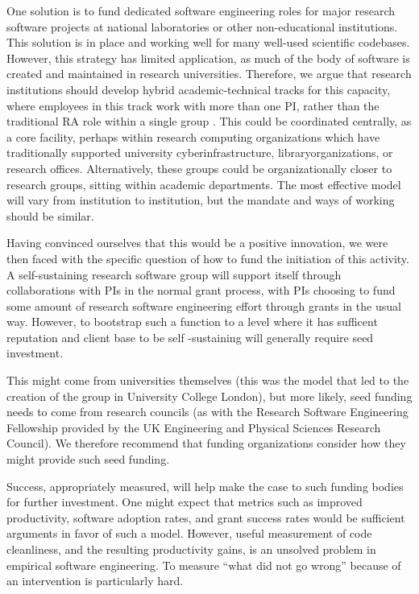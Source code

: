 One solution is to fund dedicated software engineering roles for major research software projects at national laboratories
or other non-educational institutions. This solution is in place and working well for many well-used scientific codebases.
However, this strategy has limited application, as much of the body of software is created and maintained in research
universities. Therefore, we argue that research institutions should develop hybrid academic-technical tracks for this
capacity, where employees in this track work with more than one PI, rather than the traditional RA role within a single group
. This could be coordinated centrally, as a core facility, perhaps within research computing organizations which have
traditionally supported university cyberinfrastructure, libraryorganizations, or research offices. Alternatively, these
groups could be organizationally closer to research groups, sitting within academic departments. The most effective model
will vary from institution to institution, but the mandate and ways of working should be similar.

Having convinced ourselves that this would be a positive innovation, we were then faced with the specific question of how to
fund the initiation of this activity. A self-sustaining research software group will support itself through collaborations
with PIs in the normal grant process, with PIs choosing to fund some amount of research software engineering effort through grants in
the usual way. However, to bootstrap such a function to a level where it has sufficent reputation and client base to be self
-sustaining will generally require seed investment.

This might come from universities themselves (this was the model that led to the creation of the group in University College
London), but more likely, seed funding needs to come from research councils (as with the Research Software
Engineering Fellowship provided by the UK Engineering and Physical Sciences Research Council). We therefore recommend that
funding organizations consider how they might provide such seed funding.

Success, appropriately measured, will help make the case to such funding bodies for further investment. One might expect that metrics such as improved productivity, software adoption rates, and grant success rates would be sufficient arguments in favor of such a model. However, useful measurement of code cleanliness, and the resulting productivity gains, is an unsolved problem in empirical software engineering. To measure ``what did not go wrong'' because of an intervention is particularly hard. 


